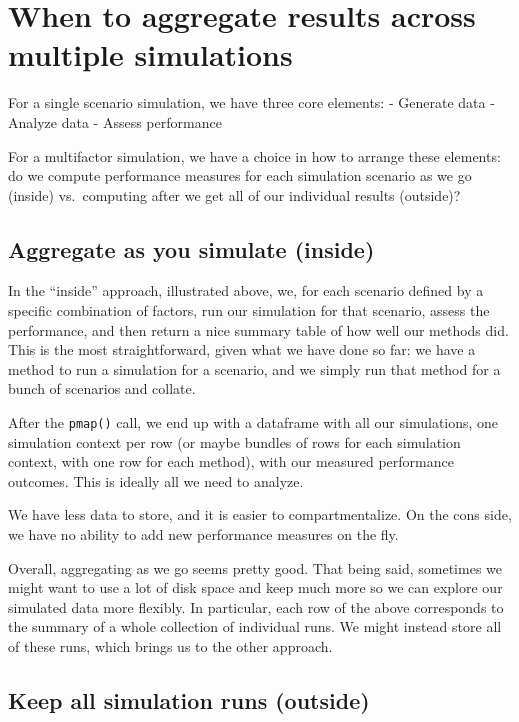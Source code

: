 \documentclass[
]{book}
\begin{document}
\section{When to aggregate results across multiple simulations}\label{when-to-aggregate-results-across-multiple-simulations}

For a single scenario simulation, we have three core elements:
- Generate data
- Analyze data
- Assess performance

For a multifactor simulation, we have a choice in how to arrange these elements: do we compute performance measures for each simulation scenario as we go (inside) vs.~computing after we get all of our individual results (outside)?

\subsection{Aggregate as you simulate (inside)}\label{aggregate-as-you-simulate-inside}

In the ``inside'' approach, illustrated above, we, for each scenario defined by a specific combination of factors, run our simulation for that scenario, assess the performance, and then return a nice summary table of how well our methods did.
This is the most straightforward, given what we have done so far: we have a method to run a simulation for a scenario, and we simply run that method for a bunch of scenarios and collate.

After the \texttt{pmap()} call, we end up with a dataframe with all our simulations, one simulation context per row (or maybe bundles of rows for each simulation context, with one row for each method), with our measured performance outcomes.
This is ideally all we need to analyze.

We have less data to store, and it is easier to compartmentalize.
On the cons side, we have no ability to add new performance measures on the fly.

Overall, aggregating as we go seems pretty good.
That being said, sometimes we might want to use a lot of disk space and keep much more so we can explore our simulated data more flexibly.
In particular, each row of the above corresponds to the summary of a whole collection of individual runs.
We might instead store all of these runs, which brings us to the other approach.

\subsection{Keep all simulation runs (outside)}\label{keep-all-simulation-runs-outside}
\end{document}
